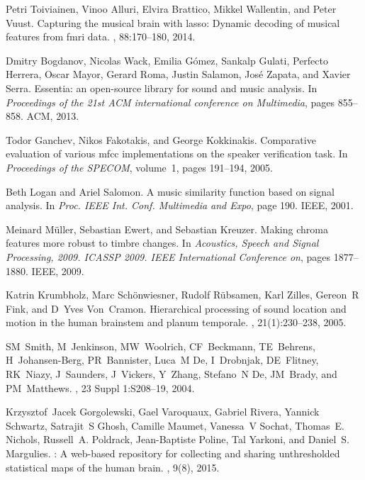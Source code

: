 \documentclass[10pt,a4paper,twocolumn]{article}
\begin{document}
\begin{thebibliography}{10}
Petri Toiviainen, Vinoo Alluri, Elvira Brattico, Mikkel Wallentin, and Peter
  Vuust.
\newblock Capturing the musical brain with lasso: Dynamic decoding of musical
  features from fmri data.
, 88:170--180, 2014.

Dmitry Bogdanov, Nicolas Wack, Emilia G{\'o}mez, Sankalp Gulati, Perfecto
  Herrera, Oscar Mayor, Gerard Roma, Justin Salamon, Jos{\'e} Zapata, and
  Xavier Serra.
\newblock Essentia: an open-source library for sound and music analysis.
\newblock In {\em Proceedings of the 21st ACM international conference on
  Multimedia}, pages 855--858. ACM, 2013.

Todor Ganchev, Nikos Fakotakis, and George Kokkinakis.
\newblock Comparative evaluation of various mfcc implementations on the speaker
  verification task.
\newblock In {\em Proceedings of the SPECOM}, volume~1, pages 191--194, 2005.

Beth Logan and Ariel Salomon.
\newblock A music similarity function based on signal analysis.
\newblock In {\em Proc. IEEE Int. Conf. Multimedia and Expo}, page 190. IEEE,
  2001.

Meinard M{\"u}ller, Sebastian Ewert, and Sebastian Kreuzer.
\newblock Making chroma features more robust to timbre changes.
\newblock In {\em Acoustics, Speech and Signal Processing, 2009. ICASSP 2009.
  IEEE International Conference on}, pages 1877--1880. IEEE, 2009.

Katrin Krumbholz, Marc Sch{\"o}nwiesner, Rudolf R{\"u}bsamen, Karl Zilles,
  Gereon~R Fink, and D~Yves Von~Cramon.
\newblock Hierarchical processing of sound location and motion in the human
  brainstem and planum temporale.
, 21(1):230--238, 2005.

SM~Smith, M~Jenkinson, MW~Woolrich, CF~Beckmann, TE~Behrens, H~Johansen-Berg,
  PR~Bannister, Luca~M De, I~Drobnjak, DE~Flitney, RK~Niazy, J~Saunders,
  J~Vickers, Y~Zhang, Stefano~N De, JM~Brady, and PM~Matthews.
, 23 Suppl 1:S208--19, 2004.

Krzysztof~Jacek Gorgolewski, Gael Varoquaux, Gabriel Rivera, Yannick Schwartz,
  Satrajit~S Ghosh, Camille Maumet, Vanessa~V Sochat, Thomas~E. Nichols,
  Russell~A. Poldrack, Jean-Baptiste Poline, Tal Yarkoni, and Daniel~S.
  Margulies.
: A web-based repository for collecting and sharing
  unthresholded statistical maps of the human brain.
, 9(8), 2015.


\end{thebibliography}
\end{document}
